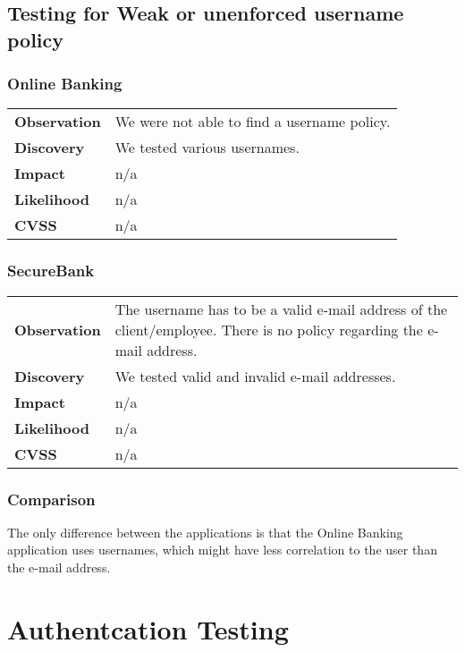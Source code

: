 \subsection{Testing for Weak or unenforced username policy}

\subsubsection*{Online Banking}

\begin{tabular}{l|p{10cm}}

\textbf{Observation} & We were not able to find a username policy.  \\
\textbf{Discovery} & We tested various usernames. \\
\textbf{Impact} & n/a \\
\textbf{Likelihood} & n/a \\
\textbf{CVSS} & n/a \\
\end{tabular}

\subsubsection*{SecureBank}

\begin{tabular}{l|p{10cm}}

\textbf{Observation} & The username has to be a valid e-mail address of the client/employee. There is no policy regarding the e-mail address.  \\
\textbf{Discovery} & We tested valid and invalid e-mail addresses. \\
\textbf{Impact} & n/a \\
\textbf{Likelihood} & n/a \\
\textbf{CVSS} & n/a \\
\end{tabular}

\subsubsection*{Comparison}
The only difference between the applications is that the Online Banking application uses usernames, which might have less correlation to the user than the e-mail address.

\clearpage



\section{Authentcation Testing}

